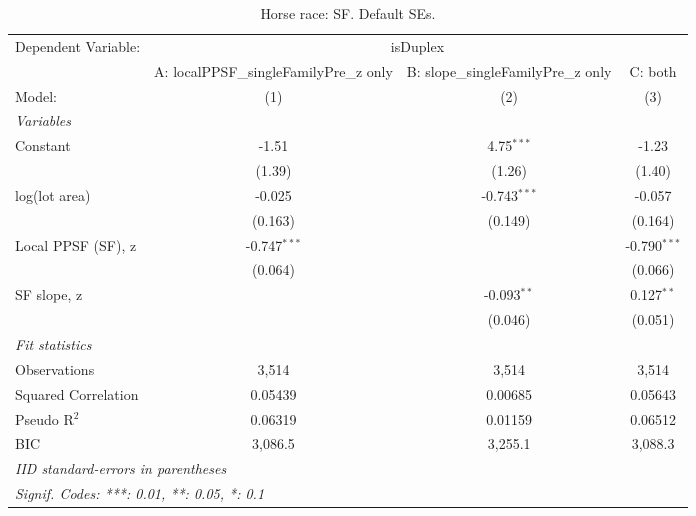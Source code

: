 
\begin{table}[htbp]
   \caption{\label{tab:horseRace_SF_default} Horse race: SF. Default SEs.}
   \centering
   \begin{tabular}{lccc}
      \tabularnewline \midrule \midrule
      Dependent Variable: & \multicolumn{3}{c}{isDuplex}\\
                          & A: localPPSF\_singleFamilyPre\_z only   & B: slope\_singleFamilyPre\_z only   & C: both \\   
      Model:              & (1)                                     & (2)                                 & (3)\\  
      \midrule
      \emph{Variables}\\
      Constant            & -1.51                                   & 4.75$^{***}$                        & -1.23\\   
                          & (1.39)                                  & (1.26)                              & (1.40)\\   
      log(lot area)       & -0.025                                  & -0.743$^{***}$                      & -0.057\\   
                          & (0.163)                                 & (0.149)                             & (0.164)\\   
      Local PPSF (SF), z  & -0.747$^{***}$                          &                                     & -0.790$^{***}$\\   
                          & (0.064)                                 &                                     & (0.066)\\   
      SF slope, z         &                                         & -0.093$^{**}$                       & 0.127$^{**}$\\   
                          &                                         & (0.046)                             & (0.051)\\   
      \midrule
      \emph{Fit statistics}\\
      Observations        & 3,514                                   & 3,514                               & 3,514\\  
      Squared Correlation & 0.05439                                 & 0.00685                             & 0.05643\\  
      Pseudo R$^2$        & 0.06319                                 & 0.01159                             & 0.06512\\  
      BIC                 & 3,086.5                                 & 3,255.1                             & 3,088.3\\  
      \midrule \midrule
      \multicolumn{4}{l}{\emph{IID standard-errors in parentheses}}\\
      \multicolumn{4}{l}{\emph{Signif. Codes: ***: 0.01, **: 0.05, *: 0.1}}\\
   \end{tabular}
\end{table}


